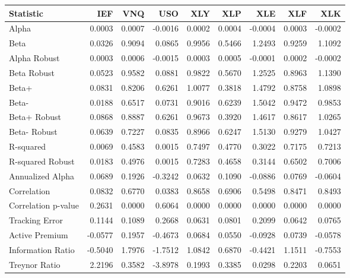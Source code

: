 \begin{tabular}{lrrrrrrrr}
\toprule
Statistic & IEF & VNQ & USO & XLY & XLP & XLE & XLF & XLK \\
\midrule
Alpha & 0.0003 & 0.0007 & -0.0016 & 0.0002 & 0.0004 & -0.0004 & 0.0003 & -0.0002 \\
Beta & 0.0326 & 0.9094 & 0.0865 & 0.9956 & 0.5466 & 1.2493 & 0.9259 & 1.1092 \\
Alpha Robust & 0.0003 & 0.0006 & -0.0015 & 0.0003 & 0.0005 & -0.0001 & 0.0002 & -0.0002 \\
Beta Robust & 0.0523 & 0.9582 & 0.0881 & 0.9822 & 0.5670 & 1.2525 & 0.8963 & 1.1390 \\
Beta+ & 0.0831 & 0.8206 & 0.6261 & 1.0077 & 0.3818 & 1.4792 & 0.8758 & 1.0898 \\
Beta- & 0.0188 & 0.6517 & 0.0731 & 0.9016 & 0.6239 & 1.5042 & 0.9472 & 0.9853 \\
Beta+ Robust & 0.0868 & 0.8887 & 0.6261 & 0.9673 & 0.3920 & 1.4617 & 0.8617 & 1.0265 \\
Beta- Robust & 0.0639 & 0.7227 & 0.0835 & 0.8966 & 0.6247 & 1.5130 & 0.9279 & 1.0427 \\
R-squared & 0.0069 & 0.4583 & 0.0015 & 0.7497 & 0.4770 & 0.3022 & 0.7175 & 0.7213 \\
R-squared Robust & 0.0183 & 0.4976 & 0.0015 & 0.7283 & 0.4658 & 0.3144 & 0.6502 & 0.7006 \\
Annualized Alpha & 0.0689 & 0.1926 & -0.3242 & 0.0632 & 0.1090 & -0.0886 & 0.0769 & -0.0604 \\
Correlation & 0.0832 & 0.6770 & 0.0383 & 0.8658 & 0.6906 & 0.5498 & 0.8471 & 0.8493 \\
Correlation p-value & 0.2631 & 0.0000 & 0.6064 & 0.0000 & 0.0000 & 0.0000 & 0.0000 & 0.0000 \\
Tracking Error & 0.1144 & 0.1089 & 0.2668 & 0.0631 & 0.0801 & 0.2099 & 0.0642 & 0.0765 \\
Active Premium & -0.0577 & 0.1957 & -0.4673 & 0.0684 & 0.0550 & -0.0928 & 0.0739 & -0.0578 \\
Information Ratio & -0.5040 & 1.7976 & -1.7512 & 1.0842 & 0.6870 & -0.4421 & 1.1511 & -0.7553 \\
Treynor Ratio & 2.2196 & 0.3582 & -3.8978 & 0.1993 & 0.3385 & 0.0298 & 0.2203 & 0.0651 \\
\bottomrule
\end{tabular}
